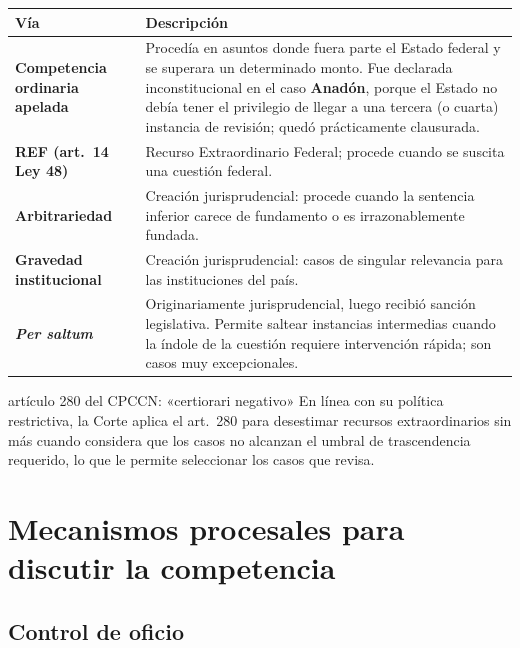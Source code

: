 \documentclass[12pt,oneside]{book}
\renewcommand{\arraystretch}{1.15}
\begin{document}
\begin{table}[H]
\centering
\renewcommand{\arraystretch}{1.3}
\begin{tabularx}{\textwidth}{>{\RaggedRight\arraybackslash}p{}>{\RaggedRight\arraybackslash}X}
\toprule
\textbf{Vía} & \textbf{Descripción} \\
\midrule
\textbf{Competencia ordinaria apelada} & Procedía en asuntos donde fuera parte el Estado federal y se superara un determinado monto. Fue declarada inconstitucional en el caso \textbf{Anadón}, porque el Estado no debía tener el privilegio de llegar a una tercera (o cuarta) instancia de revisión; quedó prácticamente clausurada. \\
\addlinespace
\textbf{REF (art.~14 Ley 48)} & Recurso Extraordinario Federal; procede cuando se suscita una cuestión federal. \\
\addlinespace
\textbf{Arbitrariedad} & Creación jurisprudencial: procede cuando la sentencia inferior carece de fundamento o es irrazonablemente fundada. \\
\addlinespace
\textbf{Gravedad institucional} & Creación jurisprudencial: casos de singular relevancia para las instituciones del país. \\
\addlinespace
\textbf{\textit{Per saltum}} & Originariamente jurisprudencial, luego recibió sanción legislativa. Permite saltear instancias intermedias cuando la índole de la cuestión requiere intervención rápida; son casos muy excepcionales. \\
\bottomrule
\end{tabularx}
\end{table}

\begin{regla}{artículo 280 del CPCCN: «certiorari negativo»}
En línea con su política restrictiva, la Corte aplica el art.~280 para desestimar recursos extraordinarios sin más cuando considera que los casos no alcanzan el umbral de trascendencia requerido, lo que le permite seleccionar los casos que revisa.
\end{regla}

\section{Mecanismos procesales para discutir la competencia}

\subsection{Control de oficio}
\end{document}

